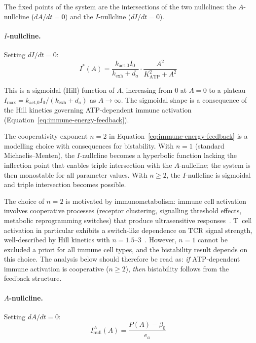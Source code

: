 The fixed points of the system are the intersections of the two nullclines: the $A$-nullcline ($dA/dt = 0$) and the $I$-nullcline ($dI/dt = 0$).

\paragraph{$I$-nullcline.}
Setting $dI/dt = 0$:
\begin{equation}
\label{eq:i-nullcline}
I^*(A) = \frac{k_{\text{act,0}} I_0}{k_{\text{exh}} + d_a} \cdot \frac{A^2}{K_{\text{ATP}}^2 + A^2}
\end{equation}

This is a sigmoidal (Hill) function of $A$, increasing from 0 at $A = 0$ to a plateau $I_{\max} = k_{\text{act,0}} I_0 / (k_{\text{exh}} + d_a)$ as $A \to \infty$. The sigmoidal shape is a consequence of the Hill kinetics governing ATP-dependent immune activation (Equation~\ref{eq:immune-energy-feedback}).

\begin{remark}
\label{rem:hill-exponent}
The cooperativity exponent $n = 2$ in Equation~\ref{eq:immune-energy-feedback} is a modelling choice with consequences for bistability. With $n = 1$ (standard Michaelis--Menten), the $I$-nullcline becomes a hyperbolic function lacking the inflection point that enables triple intersection with the $A$-nullcline; the system is then monostable for all parameter values. With $n \geq 2$, the $I$-nullcline is sigmoidal and triple intersection becomes possible.

The choice of $n = 2$ is motivated by immunometabolism: immune cell activation involves cooperative processes (receptor clustering, signalling threshold effects, metabolic reprogramming switches) that produce ultrasensitive responses~\cite{Ferrell1996ultrasensitivity}. T~cell activation in particular exhibits a switch-like dependence on TCR signal strength, well-described by Hill kinetics with $n = 1.5$--$3$~\cite{Altan-Bonnet2005}. However, $n = 1$ cannot be excluded a priori for all immune cell types, and the bistability result depends on this choice. The analysis below should therefore be read as: \emph{if} ATP-dependent immune activation is cooperative ($n \geq 2$), \emph{then} bistability follows from the feedback structure.
\end{remark}

\paragraph{$A$-nullcline.}
Setting $dA/dt = 0$:
\begin{equation}
\label{eq:a-nullcline}
I_{\text{null}}^A(A) = \frac{P(A) - \beta_0}{e_a}
\end{equation}

